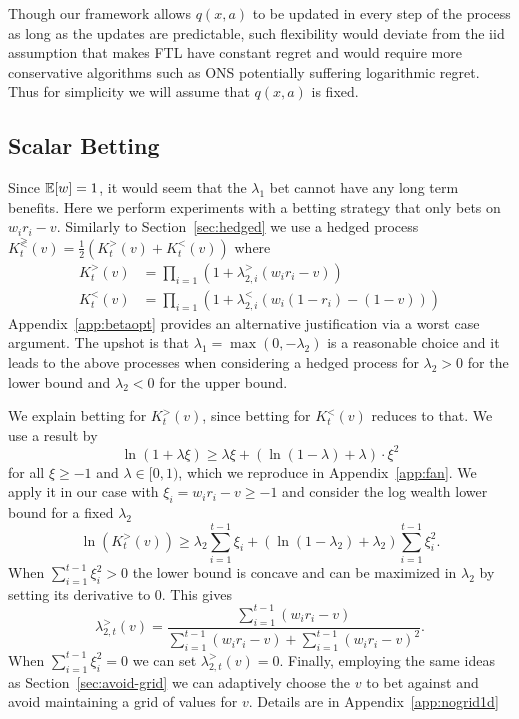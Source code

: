 Though our framework
allows $q(x,a)$ to be updated in every 
step of the process as long as the updates 
are predictable, such flexibility would 
deviate from the iid assumption that makes 
FTL have constant regret and would require more 
conservative algorithms such as ONS potentially
suffering logarithmic regret.
Thus for simplicity we will assume that 
$q(x,a)$ is fixed.

\subsection{Scalar Betting}
Since $\mathbb{E}[w]=1$, it would seem that the $\lambda_1$ bet 
cannot have any long term benefits. Here we perform experiments
with a betting strategy that only bets on $w_i r_i -v$. 
Similarly to Section~\ref{sec:hedged} we use a hedged process
$K_t^{\gtrless}(v)=\frac{1}{2}\left(K_t^{>}(v)+K_t^{<}(v)\right)$
where
\begin{align*}
K_t^{>}(v)&=\prod_{i=1} \left(1+\lambda_{2,i}^{>} (w_i r_i -v)\right)\\
K_t^{<}(v)&=\prod_{i=1} \left(1+\lambda_{2,i}^{<} \left(w_i (1-r_i) -(1-v)\right)\right)
\end{align*}
Appendix~\ref{app:betaopt} provides
an alternative justification via a worst case argument. 
The upshot is that $\lambda_1=\max(0,-\lambda_2)$ is a 
reasonable choice and it leads to the above processes
when considering a hedged process for 
$\lambda_2>0$ for the lower bound and $\lambda_2<0$ 
for the upper bound.

We explain betting for $K_t^{>}(v)$, since betting
for $K_t^{<}(v)$ reduces to that.
We use a result by \cite{fan2015exponential}
\[
\ln(1+\lambda \xi) \geq \lambda \xi+\left(\ln\left(1-\lambda\right)+\lambda\right)\cdot \xi^{2}
\]
for all $\xi\geq -1$ and $\lambda \in [0,1)$, 
which we reproduce in Appendix~\ref{app:fan}.
We apply it in our case with $\xi_i=w_ir_i-v\geq -1$ 
and consider the log wealth lower bound for a fixed $\lambda_2$
\[
\ln(K_t^{>}(v)) \geq \lambda_2 \sum_{i=1}^{t-1} \xi_i + \left(\ln\left(1-\lambda_2\right)+\lambda_2\right) \sum_{i=1}^{t-1} \xi_i^2.
\]
When $\sum_{i=1}^{t-1} \xi_i^2>0$ the lower bound is concave and can 
be maximized in $\lambda_2$ by setting its derivative to 0. This gives
\[
\lambda_{2,t}^{>}(v) = \frac{\sum_{i=1}^{t-1} (w_i r_i -v)}{\sum_{i=1}^{t-1} (w_i r_i -v)+\sum_{i=1}^{t-1} (w_i r_i -v)^2}.
\]
When $\sum_{i=1}^{t-1} \xi_i^2=0$ we can set $\lambda_{2,t}^{>}(v)=0$.
Finally, employing the same ideas as Section~\ref{sec:avoid-grid}
we can adaptively choose the $v$ to bet against and avoid 
maintaining a grid of values for $v$. Details are in 
Appendix~\ref{app:nogrid1d}

